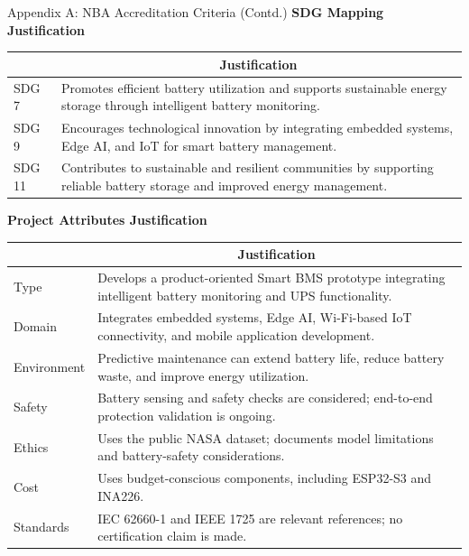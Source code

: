 \documentclass[10pt,aspectratio=43]{beamer}
\begin{document}
\begin{frame}{Appendix A: NBA Accreditation Criteria (Contd.)}
  \scriptsize
  \centering
  \renewcommand{\arraystretch}{1.1}
  \setlength{\tabcolsep}{4pt}
  \textbf{SDG Mapping Justification}\par
  \vspace{3pt}
  \begin{tabularx}{0.96\textwidth}{|p{}|X|}
    \hline
    \rowcolor{mappingheader}\multicolumn{1}{|c|}{\textbf{SDG}} & \multicolumn{1}{c|}{\textbf{Justification}} \\ \hline
    SDG 7 & Promotes efficient battery utilization and supports sustainable energy storage through intelligent battery monitoring. \\ \hline
    SDG 9 & Encourages technological innovation by integrating embedded systems, Edge AI, and IoT for smart battery management. \\ \hline
    SDG 11 & Contributes to sustainable and resilient communities by supporting reliable battery storage and improved energy management. \\ \hline
  \end{tabularx}
  \par\vspace{15pt}
  \textbf{Project Attributes Justification}\par
  \vspace{3pt}
  \begin{tabularx}{0.96\textwidth}{|p{}|X|}
    \hline
    \rowcolor{mappingheader}\multicolumn{1}{|c|}{\textbf{Attribute}} & \multicolumn{1}{c|}{\textbf{Justification}} \\ \hline
    Type & Develops a product-oriented Smart BMS prototype integrating intelligent battery monitoring and UPS functionality. \\ \hline
    Domain & Integrates embedded systems, Edge AI, Wi-Fi-based IoT connectivity, and mobile application development. \\ \hline
    Environment & Predictive maintenance can extend battery life, reduce battery waste, and improve energy utilization. \\ \hline
    Safety & Battery sensing and safety checks are considered; end-to-end protection validation is ongoing. \\ \hline
    Ethics & Uses the public NASA dataset; documents model limitations and battery-safety considerations. \\ \hline
    Cost & Uses budget-conscious components, including ESP32-S3 and INA226. \\ \hline
    Standards & IEC 62660-1 and IEEE 1725 are relevant references; no certification claim is made. \\ \hline
  \end{tabularx}
\end{frame}
\end{document}
